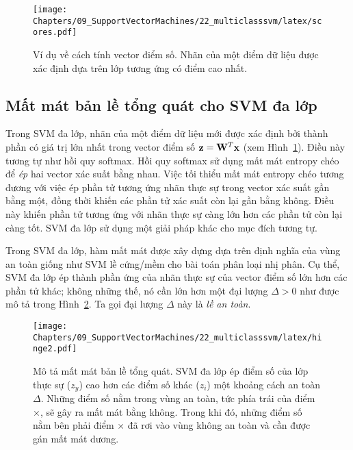 
\begin{figure}[t]
\centering
\texttt{[image: Chapters/09\_SupportVectorMachines/22\_multiclasssvm/latex/scores.pdf]}
\caption[]{Ví dụ về cách tính vector điểm số. Nhãn của một điểm dữ liệu được xác định dựa trên lớp tương ứng có điểm cao nhất.}
\label{fig:22_5}
\end{figure}



\subsection{Mất mát bản lề tổng quát cho SVM đa lớp}
Trong SVM đa lớp, nhãn của một điểm dữ liệu mới được xác định bởi thành phần có
giá trị lớn nhất trong vector điểm số $\mathbf{z} = \mathbf{W}^T\mathbf{x}$ (xem
Hình~\ref{fig:22_5}). Điều này tương tự như hồi quy softmax. Hồi quy softmax sử
dụng mất mát entropy chéo để \textit{ép} hai vector xác suất bằng nhau. Việc tối
thiểu mất mát entropy chéo tương đương với việc ép phần tử tương ứng {nhãn}
thực sự trong vector xác suất gần bằng một, đồng thời khiến các phần tử xác suất
còn lại gần bằng không. Điều này khiến  phần tử tương ứng với nhãn thực sự càng
lớn hơn các phần tử còn lại càng tốt. SVM đa lớp sử dụng một giải pháp khác cho
{mục đích tương tự}.

Trong SVM đa lớp, hàm mất mát được xây dựng dựa trên định nghĩa của vùng an toàn
giống như SVM lề cứng/mềm cho bài toán phân loại nhị phân. Cụ thể, SVM đa lớp ép
thành phần ứng của nhãn thực sự của vector điểm số lớn hơn các phần tử khác;
không những thế, nó cần lớn hơn một đại lượng $\Delta > 0$ như được mô tả trong
Hình~\ref{fig:22_6}. Ta gọi đại lượng $\Delta$ này là \textit{lề an toàn}.

\begin{figure}[t]
\centering
\texttt{[image: Chapters/09\_SupportVectorMachines/22\_multiclasssvm/latex/hinge2.pdf]}
\caption[]{Mô tả mất mát bản lề tổng quát. SVM đa lớp ép điểm số của lớp thực sự ($z_y$) cao hơn các điểm số khác
($z_i$) một khoảng cách an toàn $\Delta$. Những điểm số nằm trong vùng an toàn, tức phía trái của điểm $\times$, sẽ gây ra mất mát bằng không. Trong khi đó, những điểm số nằm bên phải điểm $\times$ đã rơi vào vùng không an toàn và cần được gán mất mát dương.}
\label{fig:22_6}
\end{figure}

